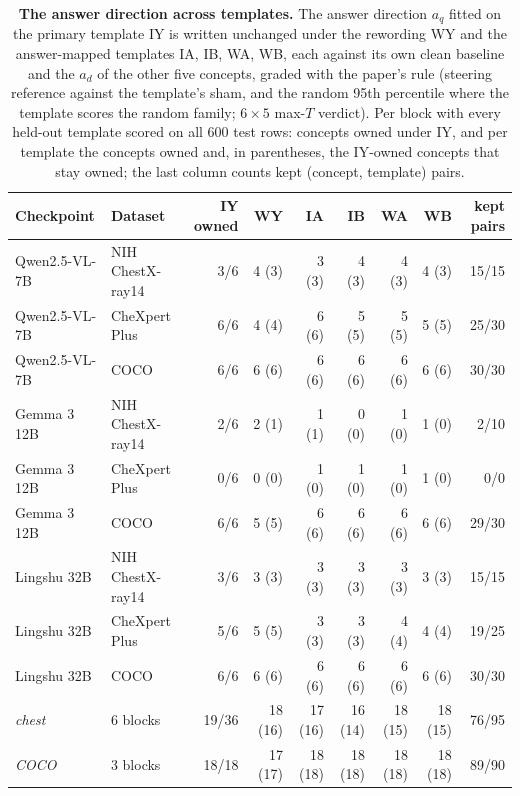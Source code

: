 \begin{table}[h]
\centering
\scriptsize
\setlength{\tabcolsep}{4pt}
\caption{\textbf{The answer direction across templates.} The answer direction $a_q$ fitted on the primary template IY is written unchanged under the rewording WY and the answer-mapped templates IA, IB, WA, WB, each against its own clean baseline and the $a_d$ of the other five concepts, graded with the paper's rule (steering reference against the template's sham, and the random 95th percentile where the template scores the random family; $6\times5$ max-$T$ verdict). Per block with every held-out template scored on all 600 test rows: concepts owned under IY, and per template the concepts owned and, in parentheses, the IY-owned concepts that stay owned; the last column counts kept (concept, template) pairs.}
\label{tab:cf-ansdirt}
\begin{tabular}{llrrrrrrr}
\toprule
Checkpoint & Dataset & IY owned & WY & IA & IB & WA & WB & kept pairs \\
\midrule
Qwen2.5-VL-7B & NIH ChestX-ray14 & 3/6 & 4 (3) & 3 (3) & 4 (3) & 4 (3) & 4 (3) & 15/15 \\
Qwen2.5-VL-7B & CheXpert Plus & 6/6 & 4 (4) & 6 (6) & 5 (5) & 5 (5) & 5 (5) & 25/30 \\
Qwen2.5-VL-7B & COCO & 6/6 & 6 (6) & 6 (6) & 6 (6) & 6 (6) & 6 (6) & 30/30 \\
Gemma 3 12B & NIH ChestX-ray14 & 2/6 & 2 (1) & 1 (1) & 0 (0) & 1 (0) & 1 (0) & 2/10 \\
Gemma 3 12B & CheXpert Plus & 0/6 & 0 (0) & 1 (0) & 1 (0) & 1 (0) & 1 (0) & 0/0 \\
Gemma 3 12B & COCO & 6/6 & 5 (5) & 6 (6) & 6 (6) & 6 (6) & 6 (6) & 29/30 \\
Lingshu 32B & NIH ChestX-ray14 & 3/6 & 3 (3) & 3 (3) & 3 (3) & 3 (3) & 3 (3) & 15/15 \\
Lingshu 32B & CheXpert Plus & 5/6 & 5 (5) & 3 (3) & 3 (3) & 4 (4) & 4 (4) & 19/25 \\
Lingshu 32B & COCO & 6/6 & 6 (6) & 6 (6) & 6 (6) & 6 (6) & 6 (6) & 30/30 \\
\midrule
\textit{chest} & 6 blocks & 19/36 & 18 (16) & 17 (16) & 16 (14) & 18 (15) & 18 (15) & 76/95 \\
\textit{COCO} & 3 blocks & 18/18 & 17 (17) & 18 (18) & 18 (18) & 18 (18) & 18 (18) & 89/90 \\
\bottomrule
\end{tabular}
\end{table}
